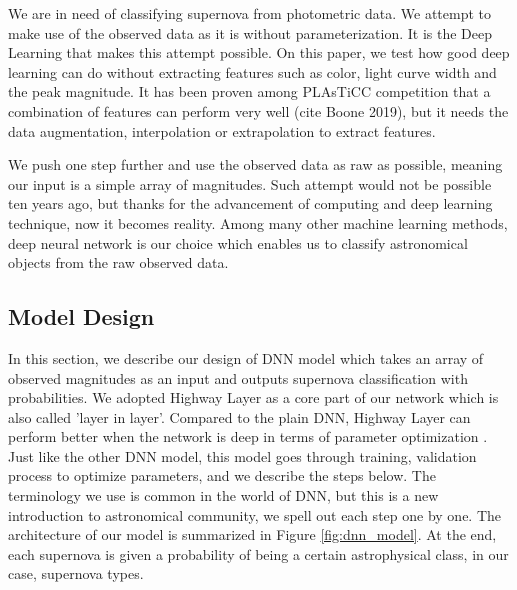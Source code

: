 \documentclass[useamsfonts]{pasj01}
\begin{document}
We are in need of classifying supernova from photometric data.  We attempt to make use of the observed data as it is without parameterization.  It is the Deep Learning that makes this attempt possible.   On this paper, we test how good deep learning can do without extracting features such as color, light curve width and the peak magnitude.  It has been proven among PLAsTiCC competition that a combination of features can perform very well (cite Boone 2019), but it needs the data augmentation, interpolation or extrapolation to extract features.

We push one step further and use the observed data as raw as possible, meaning our input is a simple array of magnitudes.  Such attempt would not be possible ten years ago, but thanks for the advancement of computing and deep learning technique, now it becomes reality.  Among many other machine learning methods, deep neural network is our choice which enables us to classify astronomical objects from the raw observed data. 

\subsection{Model Design}
In this section, we describe our design of DNN model which takes an array of observed magnitudes as an input and outputs supernova classification with probabilities.  We adopted Highway Layer \citep{srivastava15a} as a core part of our network which is also called 'layer in layer'.  Compared to the plain DNN, Highway Layer can perform better when the network is deep in terms of parameter optimization \citep{srivastava15b}.   
Just like the other DNN model, this model goes through training, validation process to optimize parameters, and we describe the steps below.  The terminology we use is common in the world of DNN, but this is a new introduction to astronomical community, we spell out each step one by one.  The architecture of our model is summarized in Figure \ref{fig:dnn_model}.
At the end, each supernova is given a probability of being a certain astrophysical class, in our case, supernova types. 
\end{document}
